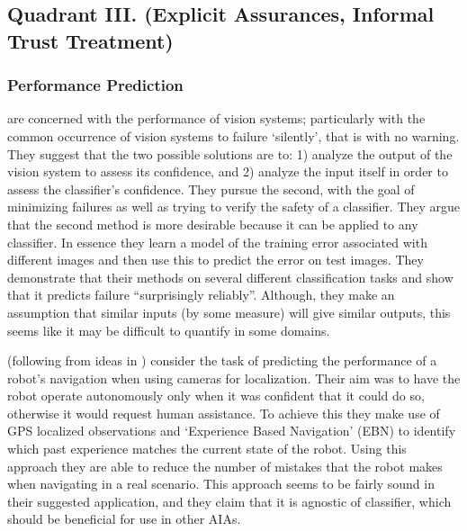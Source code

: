 \subsection{Quadrant III. (Explicit Assurances, Informal Trust Treatment)}\label{sec:q3}
\subsubsection{Performance Prediction}
    \citet{Zhang2014-he} are concerned with the performance of vision systems; particularly with the common occurrence of vision systems to failure `silently', that is with no warning. They suggest that the two possible solutions are to: 1) analyze the output of the vision system to assess its confidence, and 2) analyze the input itself in order to assess the classifier's confidence. They pursue the second, with the goal of minimizing failures as well as trying to verify the safety of a classifier. They argue that the second method is more desirable because it can be applied to any classifier. In essence they learn a model of the training error associated with different images and then use this to predict the error on test images. They demonstrate that their methods on several different classification tasks and show that it predicts failure ``surprisingly reliably''. Although, they make an assumption that similar inputs (by some measure) will give similar outputs, this seems like it may be difficult to quantify in some domains.


    \citet{Gurau2016-hs} (following from ideas in \citet{Churchill2015-ei}) consider the task of predicting the performance of a robot's navigation when using cameras for localization. Their aim was to have the robot operate autonomously only when it was confident that it could do so, otherwise it would request human assistance. To achieve this they make use of GPS localized observations and `Experience Based Navigation' (EBN) to identify which past experience matches the current state of the robot. Using this approach they are able to reduce the number of mistakes that the robot makes when navigating in a real scenario. This approach seems to be fairly sound in their suggested application, and they claim that it is agnostic of classifier, which should be beneficial for use in other AIAs.

